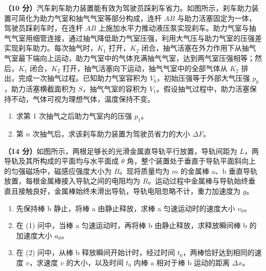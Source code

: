 \begin{question}
\textbf{（10 分）}汽车刹车助力装置能有效为驾驶员踩刹车省力。如图所示，刹车助力装置可简化为助力气室和抽气气室等部分构成，连杆 $AB$ 与助力活塞固定为一体，驾驶员踩刹车时，在连杆 $AB$ 上施加水平力推动液压泵实现刹车。助力气室与抽气气室用细管连接，通过抽气降低助力气室压强，利用大气压与助力气室的压强差实现刹车助力。每次抽气时，$K_{1}$ 打开，$K_{2}$ 闭合，抽气活塞在外力作用下从抽气气室最下端向上运动，助力气室中的气体充满抽气气室，达到两气室压强相等；然后，$K_{1}$ 闭合，$K_{2}$ 打开，抽气活塞向下运动，抽气气室中的全部气体从 $K_{2}$ 排出，完成一次抽气过程。已知助力气室容积为 $V_{0}$，初始压强等于外部大气压强 $p_{0}$，助力活塞横截面积为 $S$，抽气气室的容积为 $V_{1}$。假设抽气过程中，助力活塞保持不动，气体可视为理想气体，温度保持不变。


\begin{enumerate}[leftmargin=2em, label=(\arabic*)]
  \item 求第 1 次抽气之后助力气室内的压强 $p_{1}$。
  \item 第 $n$ 次抽气后，求该刹车助力装置为驾驶员省力的大小 $\Delta F$。
\end{enumerate}
\end{question}

\begin{question}
\textbf{（14 分）}如图所示，两根足够长的光滑金属直导轨平行放置，导轨间距为 $L$，两导轨及其所构成的平面均与水平面成 $\theta$ 角，整个装置处于垂直于导轨平面斜向上的匀强磁场中，磁感应强度大小为 $B$。现将质量均为 $m$ 的金属棒 a、b 垂直导轨放置，每根金属棒接入导轨之间的电阻均为 $R$。运动过程中金属棒与导轨始终垂直且接触良好，金属棒始终未滑出导轨，导轨电阻忽略不计，重力加速度为 $g$。


\begin{enumerate}[leftmargin=2em, label=(\arabic*)]
  \item 先保持棒 b 静止，将棒 a 由静止释放，求棒 a 匀速运动时的速度大小 $v_{0}$。
  \item 在 (1) 问中，当棒 a 匀速运动时，再将棒 b 由静止释放，求释放瞬间棒 b 的加速度大小 $a_{0}$。
  \item 在 (2) 问中，从棒 b 释放瞬间开始计时，经过时间 $t_{0}$，两棒恰好达到相同的速度 $v$，求速度 $v$ 的大小，以及时间 $t_{0}$ 内棒 a 相对于棒 b 运动的距离 $\Delta x$。
\end{enumerate}
\end{question}

